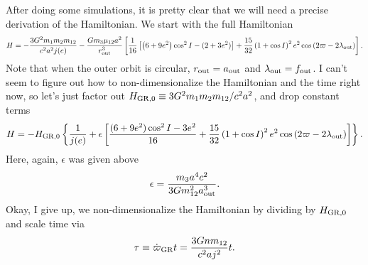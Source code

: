 \documentclass[10pt,
        usenames, %
        dvipsnames %
    ]{article}
\newcommand*{\p}[1]{\left(#1\right)}
\newcommand*{\s}[1]{\left[#1\right]}
\newcommand*{\z}[1]{\left\{#1\right\}}
\begin{document}
After doing some simulations, it is pretty clear that we will need a precise
derivation of the Hamiltonian. We start with the full Hamiltonian
\begin{equation}
    H = -\frac{3G^2m_1m_2m_{12}}{c^2a^2j(e)}
        - \frac{Gm_3\mu_{12}a^2}{r_{\rm out}^3}\s{
        \frac{1}{16}\s{\p{6 + 9e^2}\cos^2 I
            - (2 + 3e^2)} + \frac{15}{32}
                \p{1 + \cos I}^2 e^2 \cos\p{2\varpi - 2\lambda_{\rm out}}}.
\end{equation}
Note that when the outer orbit is circular, $r_{\rm out} = a_{\rm out}$ and
$\lambda_{\rm out} = f_{\rm out}$. I can't seem to figure out how to
non-dimensionalize the Hamiltonian and the time right now, so let's just factor
out $H_{\rm GR, 0} \equiv 3G^2 m_1m_2m_{12} / c^2a^2$, and drop constant terms
\begin{equation}
    H = -H_{\rm GR, 0}\z{\frac{1}{j(e)}
        + \epsilon\s{
        \frac{(6 + 9e^2)\cos^2 I - 3e^2}{16} + \frac{15}{32}
                \p{1 + \cos I}^2 e^2 \cos\p{2\varpi - 2\lambda_{\rm out}}}}.
\end{equation}
Here, again, $\epsilon$ was given above
\begin{equation}
    \epsilon = \frac{m_3a^4 c^2}{3Gm_{12}^2a_{\rm out}^3}.
\end{equation}
Okay, I give up, we non-dimensionalize the Hamiltonian by dividing by $H_{\rm
GR, 0}$ and scale time via
\begin{equation}
    \tau \equiv \dot{\varpi}_{\rm GR}t =
        \frac{3Gnm_{12}}{c^2aj^2}t.
\end{equation}
\end{document}
